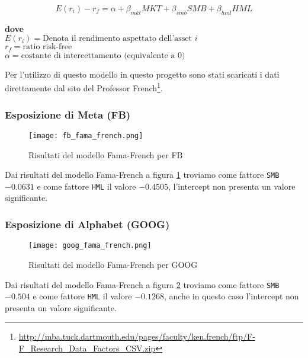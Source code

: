 \begin{displaymath}
    E(r_i) - r_f = \alpha + \beta_{mkt}MKT + \beta_{smb}SMB + \beta_{hml}HML
\end{displaymath}

\textbf{dove}\\
\(E(r_i) = \text{Denota il rendimento aspettato dell'asset } i\)\\
\(r_f = \text{ratio risk-free}\)\\
\(\alpha = \text{costante di intercettamento (equivalente a 0)}\)

Per l'utilizzo di questo modello in questo progetto sono stati scaricati i dati direttamente dal sito del Professor 
French\footnote{
    \href{http://mba.tuck.dartmouth.edu/pages/faculty/ken.french/ftp/F-F_Research_Data_Factors_CSV.zip}{http://mba.tuck.dartmouth.edu/pages/faculty/ken.french/ftp/F-F\_Research\_Data\_Factors\_CSV.zip}
}.

\subsubsection{Esposizione di Meta (FB)}

\begin{figure}[ht]
    \centering
    \texttt{[image: fb\_fama\_french.png]}
    \caption{Risultati del modello Fama-French per FB}
    \label{fig:fb_fama_french}
\end{figure}

Dai risultati del modello Fama-French a figura \ref{fig:fb_fama_french} troviamo come fattore \verb|SMB| $-0.0631$ e come fattore \verb|HML| il valore $-0.4505$, l'intercept non presenta un valore significante.

\pagebreak

\subsubsection{Esposizione di Alphabet (GOOG)}

\begin{figure}[ht]
    \centering
    \texttt{[image: goog\_fama\_french.png]}
    \caption{Risultati del modello Fama-French per GOOG}
    \label{fig:goog_fama_french}
\end{figure}

Dai risultati del modello Fama-French a figura \ref{fig:goog_fama_french} troviamo come fattore \verb|SMB| $-0.504$ e come fattore \verb|HML| il valore $-0.1268$, 
anche in questo caso l'intercept non presenta un valore significante.

